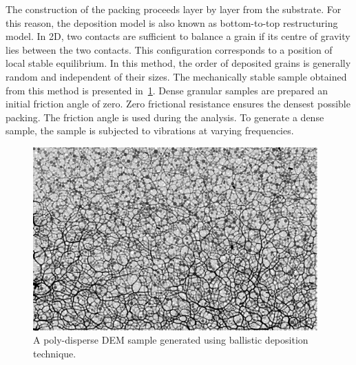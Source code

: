 The construction of the packing proceeds layer by layer from the 
substrate. For this reason, the deposition model is also known as bottom-to-top 
restructuring model. 
%
%
In 2D, two contacts are sufficient to balance a grain if its 
centre of gravity lies between the two contacts. This configuration corresponds 
to a position of local stable equilibrium. 
In this method, the order of deposited grains is generally random and 
independent of their sizes. The mechanically stable sample obtained from this 
method is presented in~\cref{fig:DEM_Sample_r6}. 
Dense granular samples are prepared an initial friction angle of zero. Zero 
frictional resistance ensures the densest possible packing. The friction angle 
is used during the analysis. To generate a dense sample, the sample is 
subjected to vibrations at varying frequencies. 

\begin{figure}[htbp]
\centering
	\includegraphics[width=0.975\textwidth]{DEM_Sample_r6}
	\caption{A poly-disperse DEM sample generated using ballistic deposition 
	technique.}
	\label{fig:DEM_Sample_r6}
\end{figure}

